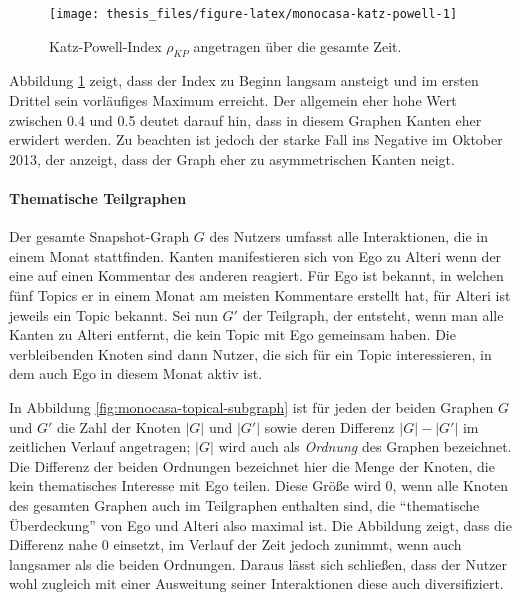 \documentclass[11pt,a4paper,twoside]{article}
\let\oldpar\paragraph
\renewcommand{\paragraph}{\oldpar*}
\begin{document}
\begin{figure}

{\centering \texttt{[image: thesis\_files/figure-latex/monocasa-katz-powell-1]} 

}

\caption{Katz-Powell-Index \(\rho_{KP}\) angetragen
über die gesamte Zeit.}\label{fig:monocasa-katz-powell}
\end{figure}

Abbildung \ref{fig:monocasa-katz-powell} zeigt, dass der Index zu Beginn
langsam ansteigt und im ersten Drittel sein vorläufiges Maximum
erreicht. Der allgemein eher hohe Wert zwischen 0.4 und 0.5 deutet
darauf hin, dass in diesem Graphen Kanten eher erwidert werden. Zu
beachten ist jedoch der starke Fall ins Negative im Oktober 2013, der
anzeigt, dass der Graph eher zu asymmetrischen Kanten neigt.

\hypertarget{thematische-teilgraphen}{%
\paragraph{Thematische Teilgraphen}\label{thematische-teilgraphen}}

Der gesamte Snapshot-Graph \(G\) des Nutzers umfasst alle Interaktionen,
die in einem Monat stattfinden. Kanten manifestieren sich von Ego zu
Alteri wenn der eine auf einen Kommentar des anderen reagiert. Für Ego
ist bekannt, in welchen fünf Topics er in einem Monat am meisten
Kommentare erstellt hat, für Alteri ist jeweils ein Topic bekannt. Sei
nun \(G'\) der Teilgraph, der entsteht, wenn man alle Kanten zu Alteri
entfernt, die kein Topic mit Ego gemeinsam haben. Die verbleibenden
Knoten sind dann Nutzer, die sich für ein Topic interessieren, in dem
auch Ego in diesem Monat aktiv ist.

In Abbildung \ref{fig:monocasa-topical-subgraph} ist für jeden der
beiden Graphen \(G\) und \(G'\) die Zahl der Knoten \(|G|\) und \(|G'|\)
sowie deren Differenz \(|G|- |G'|\) im zeitlichen Verlauf angetragen;
\(|G|\) wird auch als \emph{Ordnung} des Graphen bezeichnet. Die
Differenz der beiden Ordnungen bezeichnet hier die Menge der Knoten, die
kein thematisches Interesse mit Ego teilen. Diese Größe wird 0, wenn
alle Knoten des gesamten Graphen auch im Teilgraphen enthalten sind, die
\enquote{thematische Überdeckung} von Ego und Alteri also maximal ist.
Die Abbildung zeigt, dass die Differenz nahe 0 einsetzt, im Verlauf der
Zeit jedoch zunimmt, wenn auch langsamer als die beiden Ordnungen.
Daraus lässt sich schließen, dass der Nutzer wohl zugleich mit einer
Ausweitung seiner Interaktionen diese auch diversifiziert.
\end{document}
